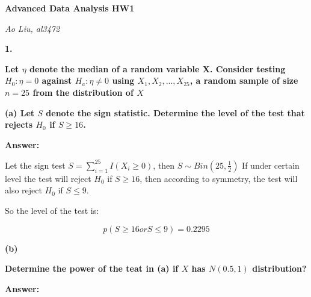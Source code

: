 \documentclass[letterpaper,11pt]{article}
\begin{document}
  \begin{center}
  	\textbf{\Huge{Advanced Data Analysis HW1}}
  \end{center}

  \begin{center}
  	\textsl{Ao Liu, al3472}
  \end{center}


  \bigbreak
  \bigbreak
  \bigbreak



    \begin{addmargin}[-2em]{0em} \large{\textbf{1. }}\end{addmargin}
    \begin{addmargin}[-1.1em]{0em} \textbf{Let $\eta$ denote the median of a random variable X. Consider testing $H_0: \eta = 0$ against $H_a: \eta \neq 0$ using $X_1,X_2,...,X_{25}$, a random sample of size $n = 25$ from the distribution of $X$}\par \end{addmargin}


  \begin{addmargin}[-1.1em]{0em} \textbf{(a)  Let $S$ denote the sign statistic. Determine the level of the test that rejects $H_0$ if $S\geq16$.}\par \end{addmargin}


    \bigbreak
    \begin{addmargin}[-0.5em]{0em}
    \textbf{Answer: }\end{addmargin}

Let the sign test $S = \sum_{i=1}^{25}I(X_i\geq0)$, then $S\sim Bin(25,\frac{1}{2})$
If under certain level the test will reject $H_0$ if $S\geq16$, then according to symmetry, the test will also reject $H_0$ if $S\leq9$.\par
So the level of the test is:\par
$$p(S\geq16 or S\leq9)=0.2295$$
\bigbreak


\begin{addmargin}[-1.1em]{0em}
\textbf{(b)}\par\end{addmargin}
  \textbf{Determine the power of the teat in
  (a) if $X$ has $N(0.5,1)$ distribution?} \par
\bigbreak

\begin{addmargin}[-0.5em]{0em}
\textbf{Answer: }\end{addmargin}
\end{document}
